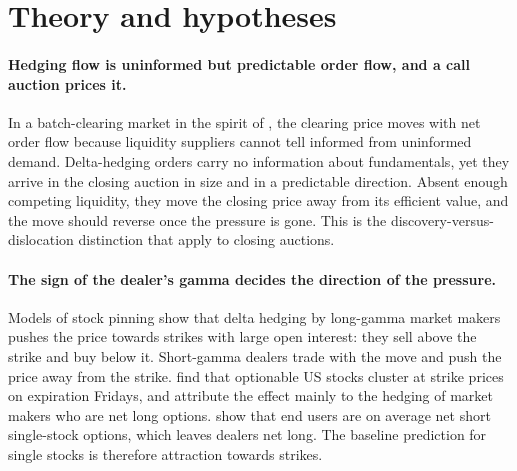 \documentclass[11pt,a4paper]{article}
\begin{document}
\section{Theory and hypotheses}

\paragraph{Hedging flow is uninformed but predictable order flow, and a call auction prices it.} In a batch-clearing market in the spirit of \citet{Kyle1985}, the clearing price moves with net order flow because liquidity suppliers cannot tell informed from uninformed demand. Delta-hedging orders carry no information about fundamentals, yet they arrive in the closing auction in size and in a predictable direction. Absent enough competing liquidity, they move the closing price away from its efficient value, and the move should reverse once the pressure is gone. This is the discovery-versus-dislocation distinction that \citet{ComertonFordeRindi2022} apply to closing auctions.

\paragraph{The sign of the dealer's gamma decides the direction of the pressure.} Models of stock pinning \citep{AvellanedaLipkin2003} show that delta hedging by long-gamma market makers pushes the price towards strikes with large open interest: they sell above the strike and buy below it. Short-gamma dealers trade with the move and push the price away from the strike. \citet{NiPearsonPoteshman2005} find that optionable US stocks cluster at strike prices on expiration Fridays, and attribute the effect mainly to the hedging of market makers who are net long options. \citet{GarleanuPedersenPoteshman2009} show that end users are on average net short single-stock options, which leaves dealers net long. The baseline prediction for single stocks is therefore attraction towards strikes.
\end{document}
